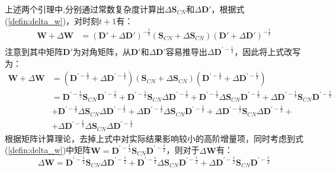 上述两个引理中,分别通过常数复杂度计算出$\Delta\textbf{S}_{CN}$和$\Delta\textbf{D}'$，根据式(\ref{defin:delta_w})，对时刻$t+1$有：
\begin{equation}
	\begin{aligned}
	\textbf{W} + \Delta\textbf{W} &= (\textbf{D}'+\Delta\textbf{D}')^{-\frac{1}{2}}(\textbf{S}_{CN}+\Delta\textbf{S}_{CN})(\textbf{D}'+\Delta\textbf{D}')^{-\frac{1}{2}} \\	
	\end{aligned}
\end{equation}
注意到其中矩阵$\textbf{D}'$为对角矩阵，从$\textbf{D}'$和$\Delta\textbf{D}'$容易推导出$\Delta\textbf{D}^{\prime-\frac{1}{2}}$，因此将上式改写为：
\begin{equation}
	\begin{aligned}
	\textbf{W} + \Delta\textbf{W} &= (\textbf{D}^{\prime-\frac{1}{2}}+\Delta\textbf{D}^{\prime-\frac{1}{2}})(\textbf{S}_{CN}+\Delta\textbf{S}_{CN})(\textbf{D}^{\prime-\frac{1}{2}}+\Delta\textbf{D}^{\prime-\frac{1}{2}}) \\	
	& = \textbf{D}^{\prime-\frac{1}{2}}\textbf{S}_{CN}\textbf{D}^{\prime-\frac{1}{2}}+
	\textbf{D}^{\prime-\frac{1}{2}}\textbf{S}_{CN}\Delta\textbf{D}^{\prime-\frac{1}{2}}+
	\textbf{D}^{\prime-\frac{1}{2}}\Delta\textbf{S}_{CN}\textbf{D}^{\prime-\frac{1}{2}}+
	\Delta\textbf{D}^{\prime-\frac{1}{2}}\textbf{S}_{CN}\textbf{D}^{\prime-\frac{1}{2}}\\
	&+\textbf{D}^{\prime-\frac{1}{2}}\Delta\textbf{S}_{CN}\Delta\textbf{D}^{\prime-\frac{1}{2}}+
	\Delta\textbf{D}^{\prime-\frac{1}{2}}\Delta\textbf{S}_{CN}\textbf{D}^{\prime-\frac{1}{2}}+
	\Delta\textbf{D}^{\prime-\frac{1}{2}}\textbf{S}_{CN}\Delta\textbf{D}^{\prime-\frac{1}{2}}+\\
	&+\Delta\textbf{D}^{\prime-\frac{1}{2}}\Delta\textbf{S}_{CN}\Delta\textbf{D}^{\prime-\frac{1}{2}}
	\end{aligned}
\end{equation}
根据矩阵计算理论\cite{golub2012matrix}，去掉上式中对实际结果影响较小的高阶增量项，同时考虑到式(\ref{defin:delta_w})中矩阵$\textbf{W}= \textbf{D}^{\prime-\frac{1}{2}}\textbf{S}_{CN}\textbf{D}^{\prime-\frac{1}{2}}$，则对于$\Delta\textbf{W}$有：
\begin{equation}
	\Delta\textbf{W}= \textbf{D}^{\prime-\frac{1}{2}}\textbf{S}_{CN}\Delta\textbf{D}^{\prime-\frac{1}{2}}+
	\textbf{D}^{\prime-\frac{1}{2}}\Delta\textbf{S}_{CN}\textbf{D}^{\prime-\frac{1}{2}}+
	\Delta\textbf{D}^{\prime-\frac{1}{2}}\textbf{S}_{CN}\textbf{D}^{\prime-\frac{1}{2}}
\end{equation}
